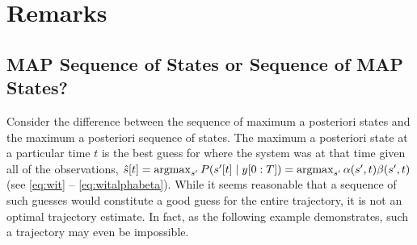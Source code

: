 \section{Remarks}
\label{sec:AlgApp}

\subsection{MAP Sequence of States or Sequence of MAP States?}
\label{sec:sequenceMAP}

%

Consider the difference between the sequence of maximum a posteriori states
and the maximum a posteriori sequence of states.  The maximum a posteriori state
at a particular time $t$ is the best guess for where the system was at
that time given all of the observations, \ie
%
${\hat s}{[t]} = \operatorname*{argmax}_{s'}P({s'}{[t]}\mid y[0:T]) =
\operatorname*{argmax}_{s'}\alpha(s',t) \beta(s',t)$
%
(see \eqref{eq:wit} --
\eqref{eq:witalphabeta}).  While it seems reasonable that a sequence
of such guesses would constitute a good guess for the entire
trajectory, it is not an optimal trajectory estimate.  In fact, as the
following example demonstrates, such a trajectory may even be
impossible.

